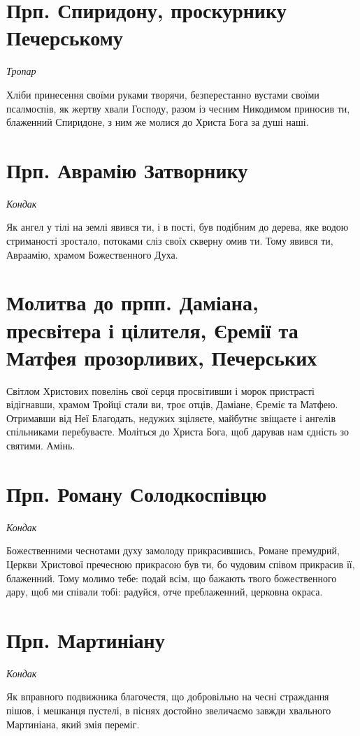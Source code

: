 \documentclass[chapters.tex]{subfiles}
\begin{document}
\section{Прп. Спиридону, проскурнику Печерському}
\emph{Тропар}

Хліби принесення своїми руками творячи, безперестанно вустами своїми псалмоспів, як жертву хвали Господу, разом із чесним Никодимом приносив ти, блаженний Спиридоне, з ним же молися до Христа Бога за душі наші.

\section{Прп. Аврамію Затворнику}
\emph{Кондак}

Як ангел у тілі на землі явився ти, і в пості, був подібним до дерева, яке водою стриманості зростало, потоками сліз своїх скверну омив ти. Тому явився ти, Авраамію, храмом Божественного Духа.

\section{Молитва до прпп. Даміана, пресвітера і цілителя, Єремії та Матфея прозорливих, Печерських}
Світлом Христових повелінь свої серця просвітивши і морок пристрасті відігнавши, храмом Тройці стали ви, троє отців, Даміане, Єреміє та Матфею. Отримавши від Неї Благодать, недужих зціляєте, майбутнє звіщаєте і ангелів спільниками перебуваєте. Моліться до Христа Бога, щоб дарував нам єдність зо святими. Амінь.

\section{Прп. Роману Солодкоспівцю}
\emph{Кондак}

Божественними чеснотами духу замолоду прикрасившись, Романе премудрий, Церкви Христової пречесною прикрасою був ти, бо чудовим співом прикрасив її, блаженний. Тому молимо тебе: подай всім, що бажають твого божественного дару, щоб ми співали тобі: радуйся, отче преблаженний, церковна окраса.

\section{Прп. Мартиніану}
\emph{Кондак}

Як вправного подвижника благочестя, що добровільно на чесні страждання пішов, і мешканця пустелі, в піснях достойно звеличаємо завжди хвального Мартиніана, який змія переміг.
\end{document}

